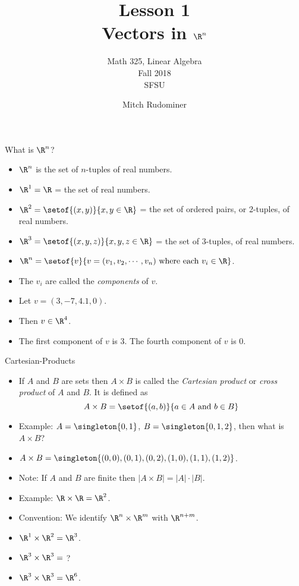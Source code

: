 \documentclass{beamer}
\title{Lesson 1 \\ Vectors in $\R^n$}
\subtitle{Math 325, Linear Algebra \\ Fall 2018 \\ SFSU}
\author{Mitch Rudominer}
\date{}
\begin{document}
\begin{frame}
  \titlepage
\end{frame}

\begin{frame}{What is $\R^n$?}

\begin{itemize}
\item $\R^n$ is the set of $n$-tuples of real numbers.
\item $\R^1=\R$ = the set of real numbers.
\item $\R^2 = \setof{(x,y)}{x,y\in\R}$ = the set of ordered pairs,
or 2-tuples, of real numbers.
\item $\R^3 = \setof{(x,y,z)}{x,y,z\in\R}$ = the set of
3-tuples, of real numbers.
\item $\R^n = \setof{v}{v = (v_1, v_2, \cdots, v_n) \text{ where each } v_i\in\R}$.
\item The $v_i$ are called the \emph{components} of $v$.
\item Let $v = (3, -7, 4.1, 0)$.
\item Then $v\in\R^4$.
\item The first component of
$v$ is 3. The fourth component of $v$ is 0.
\end{itemize}

\end{frame}

\begin{frame}{Cartesian-Products}

\begin{itemize}
\item If $A$ and $B$ are sets then $A\times B$ is called the
\emph{Cartesian product} or \emph{cross product} of $A$ and $B$. It is
defined as
$$A\times B=\setof{(a, b)}{a\in A \text{ and } b\in B}$$
\item Example: $A=\singleton{0,1}$, $B=\singleton{0, 1, 2}$, then
what is $A\times B$?
\item $A\times B = \singleton{(0,0), (0,1), (0,2), (1,0), (1,1), (1,2)}$.
\item Note: If $A$ and $B$ are finite then $|A\times B| = |A| \cdot |B|$.
\item Example: $\R\times \R = \R^2$.
\item Convention: We identify $\R^n \times \R^m$ with $\R^{n+m}$.
\item $\R^1\times\R^2 = \R^3$.
\item $\R^3\times\R^3=$ ?
\item $\R^3\times\R^3=\R^6$.
\end{itemize}
\end{frame}
\end{document}

